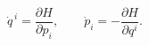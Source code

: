 \begin{equation}
  \dot{q}^{\,i} = \frac{\partial H}{\partial p_i}, \qquad
  \dot{p}_i = - \frac{\partial H}{\partial q^i}.
\label{Heqs}
\end{equation}

